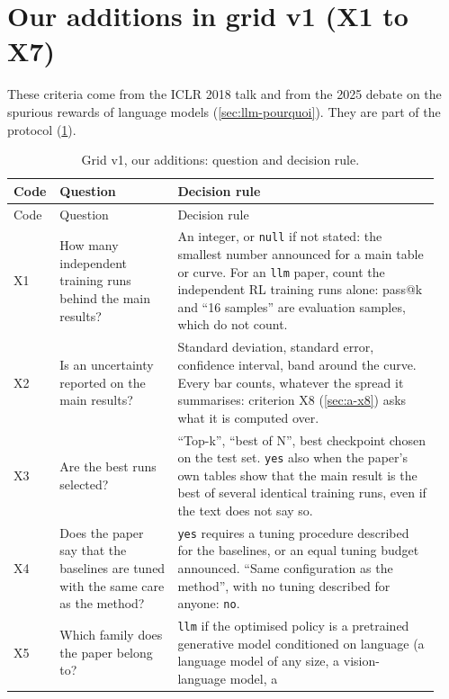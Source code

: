 \section{Our additions in grid v1 (X1 to X7)}
\label{sec:a-x}

These criteria come from the ICLR 2018 talk and from the 2025 debate on the spurious rewards of
language models (\cref{sec:llm-pourquoi}). They are part of the protocol
(\cref{tab:a-grille-x}).

\begin{small}
\begin{longtable}{@{}p{0.07\linewidth}>{\raggedright\arraybackslash}p{0.27\linewidth}>{\raggedright\arraybackslash}p{0.6\linewidth}@{}}
\caption{Grid v1, our additions: question and decision rule.}\label{tab:a-grille-x}\\
\toprule
Code & Question & Decision rule \\
\midrule
\endfirsthead
\toprule
Code & Question & Decision rule \\
\midrule
\endhead
\bottomrule
\endfoot
X1 & How many independent training runs behind the main results? & An integer, or \texttt{null} if
  not stated: the smallest number announced for a main table or curve. For an \texttt{llm} paper,
  count the independent RL training runs alone: pass@k and \enquote{16 samples} are evaluation
  samples, which do not count. \\
X2 & Is an uncertainty reported on the main results? & Standard deviation, standard error, confidence
  interval, band around the curve. Every bar counts, whatever the spread it summarises: criterion X8
  (\cref{sec:a-x8}) asks what it is computed over. \\
X3 & Are the best runs selected? & \enquote{Top-k}, \enquote{best of N}, best checkpoint chosen on
  the test set. \texttt{yes} also when the paper's own tables show that the main result is the best
  of several identical training runs, even if the text does not say so. \\
X4 & Does the paper say that the baselines are tuned with the same care as the method? &
  \texttt{yes} requires a tuning procedure described for the baselines, or an equal tuning budget
  announced. \enquote{Same configuration as the method}, with no tuning described for anyone:
  \texttt{no}. \\
X5 & Which family does the paper belong to? & \texttt{llm} if the optimised policy is a pretrained
  generative model conditioned on language (a language model of any size, a vision-language model, a

\end{longtable}
\end{small}
